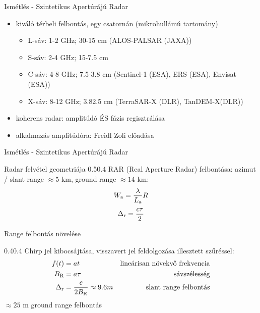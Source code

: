 \def\ft{Ismétlés - Szintetikus Apertúrájú Radar}

\begin{frame}{\ft}
    \begin{itemize}
        \item kiváló térbeli felbontás, egy csatornán (mikrohullámú tartomány)
        \begin{itemize}
            \item L-sáv: 1-2 GHz; 30-15 cm (ALOS-PALSAR (JAXA))
            \item S-sáv: 2-4 GHz; 15-7.5 cm
            \item C-sáv: 4-8 GHz; 7.5-3.8 cm (Sentinel-1 (ESA), ERS (ESA), Envisat (ESA))
            \item X-sáv: 8-12 GHz; 3.82.5 cm (TerraSAR-X (DLR), TanDEM-X(DLR))
        \end{itemize}
        \item koherens radar: amplitúdó ÉS fázis regisztrálása
        \item alkalmazás amplitúdóra: Freidl Zoli előadása
    \end{itemize}
\end{frame}


\begin{frame}{\ft}
    \begin{figp}{}{Radar felvétel geometriája \cite{RamonHanssen}}{0.5}{0.4}
        RAR (Real Aperture Radar) felbontása: azimut / slant range $\approx 5$ km, ground range $\approx 14$ km:
        $$ W_{\text{a}} = \frac{\lambda}{L_{\text{a}}} R $$
        $$ \Delta_{\text{r}} = \frac{c\tau}{2} $$
    \end{figp}
\end{frame}

\def\ft{Range felbontás növelése}

\begin{frame}{\ft}
    \begin{figp}{}{}{0.4}{0.4}
        Chirp jel kibocsájtása, visszavert jel feldolgozása illesztett szűréssel:
        \begin{align*}
            f(t) &= a t & \text{lineárisan növekvő frekvencia} \\
            B_{\text{R}} &= a \tau & \text{sávszélesség} \\
            \Delta_{\text{r}} &= \frac{c}{2 B_{\text{R}}} \approx 9.6 m & \text{slant range felbontás}
        \end{align*}
        $\approx 25$ m ground range felbontás
    \end{figp}
\end{frame}

